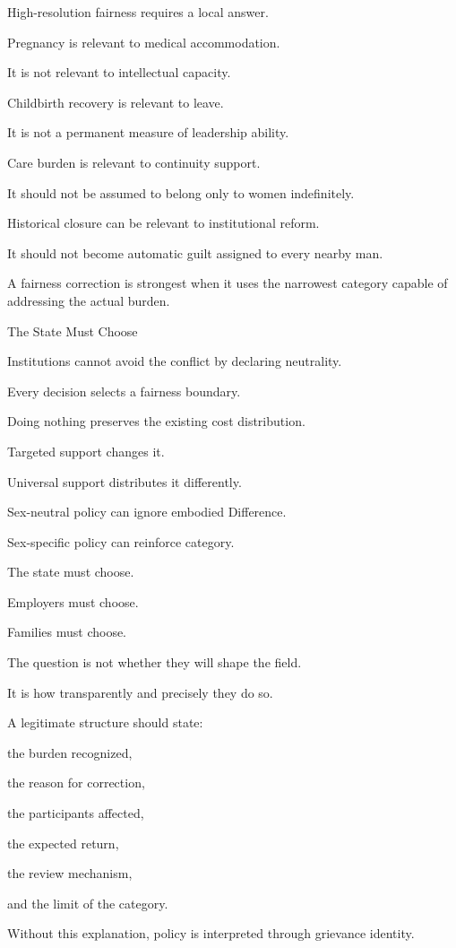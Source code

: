 High-resolution fairness requires a local answer.

Pregnancy is relevant to medical accommodation.

It is not relevant to intellectual capacity.

Childbirth recovery is relevant to leave.

It is not a permanent measure of leadership ability.

Care burden is relevant to continuity support.

It should not be assumed to belong only to women indefinitely.

Historical closure can be relevant to institutional reform.

It should not become automatic guilt assigned to every nearby man.

A fairness correction is strongest when it uses the narrowest category capable of addressing the actual burden.

The State Must Choose

Institutions cannot avoid the conflict by declaring neutrality.

Every decision selects a fairness boundary.

Doing nothing preserves the existing cost distribution.

Targeted support changes it.

Universal support distributes it differently.

Sex-neutral policy can ignore embodied Difference.

Sex-specific policy can reinforce category.

The state must choose.

Employers must choose.

Families must choose.

The question is not whether they will shape the field.

It is how transparently and precisely they do so.

A legitimate structure should state:

the burden recognized,

the reason for correction,

the participants affected,

the expected return,

the review mechanism,

and the limit of the category.

Without this explanation, policy is interpreted through grievance identity.

